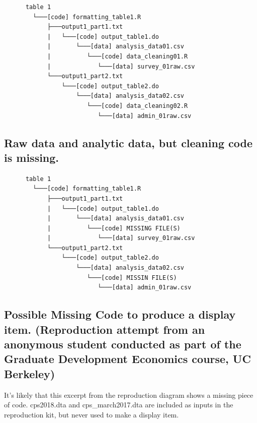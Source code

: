 \documentclass[]{book}
\begin{document}
\begin{verbatim}
      table 1
        └───[code] formatting_table1.R
            ├───output1_part1.txt  
            |   └───[code] output_table1.do           
            |       └───[data] analysis_data01.csv
            |          └───[code] data_cleaning01.R
            |             └───[data] survey_01raw.csv
            └───output1_part2.txt  
                └───[code] output_table2.do           
                    └───[data] analysis_data02.csv
                       └───[code] data_cleaning02.R
                          └───[data] admin_01raw.csv  
\end{verbatim}

\hypertarget{raw-data-and-analytic-data-but-cleaning-code-is-missing.}{%
\subsection{Raw data and analytic data, but cleaning code is missing.}\label{raw-data-and-analytic-data-but-cleaning-code-is-missing.}}

\begin{verbatim}
      table 1
        └───[code] formatting_table1.R
            ├───output1_part1.txt  
            |   └───[code] output_table1.do           
            |       └───[data] analysis_data01.csv
            |          └───[code] MISSING FILE(S)
            |             └───[data] survey_01raw.csv
            └───output1_part2.txt  
                └───[code] output_table2.do           
                    └───[data] analysis_data02.csv
                       └───[code] MISSIN FILE(S)
                          └───[data] admin_01raw.csv  
\end{verbatim}

\hypertarget{possible-missing-code-to-produce-a-display-item.-reproduction-attempt-from-an-anonymous-student-conducted-as-part-of-the-graduate-development-economics-course-uc-berkeley}{%
\subsection{Possible Missing Code to produce a display item. (Reproduction attempt from an anonymous student conducted as part of the Graduate Development Economics course, UC Berkeley)}\label{possible-missing-code-to-produce-a-display-item.-reproduction-attempt-from-an-anonymous-student-conducted-as-part-of-the-graduate-development-economics-course-uc-berkeley}}

It's likely that this excerpt from the reproduction diagram shows a missing piece of code. cps2018.dta and cps\_march2017.dta are included as inputs in the reproduction kit, but never used to make a display item.
\end{document}

